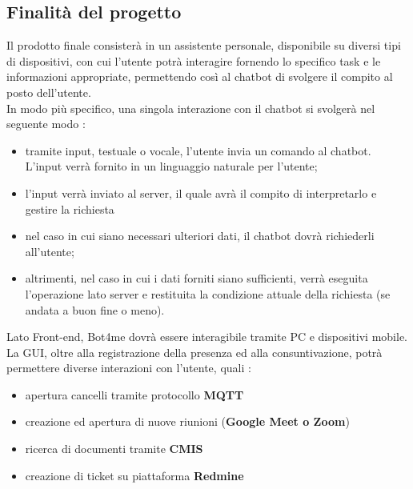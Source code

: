 \subsection{Finalità del progetto}
Il prodotto finale consisterà in un assistente personale, disponibile su diversi tipi di dispositivi, con cui l'utente potrà interagire fornendo lo specifico task e le informazioni appropriate, permettendo così al chatbot di svolgere il compito al posto dell'utente.
\\In modo più specifico, una singola interazione con il chatbot si svolgerà nel seguente modo :
\begin{itemize}
	\item tramite input, testuale o vocale, l'utente invia un comando al 
	chatbot. L'input verrà fornito in un linguaggio naturale per l'utente;
	\item l'input verrà inviato al server, il quale avrà il compito di interpretarlo e gestire la richiesta
	\item nel caso in cui siano necessari ulteriori dati, il chatbot dovrà richiederli all'utente;
	\item altrimenti, nel caso in cui i dati forniti siano sufficienti, verrà eseguita l'operazione lato server e restituita la condizione attuale della richiesta (se andata a buon fine o meno). 
\end{itemize}
Lato Front-end, Bot4me dovrà essere interagibile tramite PC e dispositivi mobile.
\\La GUI, oltre alla registrazione della presenza ed alla consuntivazione, potrà permettere diverse interazioni con l'utente, quali :
\begin{itemize}
	\item apertura cancelli tramite protocollo \textbf{MQTT}
	\item creazione ed apertura di nuove riunioni (\textbf{Google Meet o Zoom})
	\item ricerca di documenti tramite \textbf{CMIS}
	\item creazione di ticket su piattaforma \textbf{Redmine}
\end{itemize}

